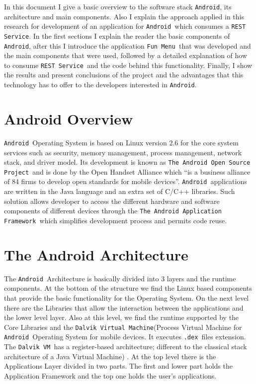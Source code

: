 \documentclass[journal]{IEEEtran}
\newcommand{\andr}{\texttt{Android}}
\newcommand{\andrs}{\texttt{Android~}}
\newcommand{\rests}{\texttt{REST Service}}
\newcommand{\restss}{\texttt{REST Service~}}
\newcommand{\funs}{\texttt{Fun Menu~}}
\newcommand{\aosps}{\texttt{The Android Open Source Project~}}
\newcommand{\apf}{\texttt{The Android Application Framework~}}
\newcommand{\dexs}{\texttt{.dex~}}
\newcommand{\dvm}{\texttt{Dalvik Virtual Machine}}
\newcommand{\dms}{\texttt{Dalvik VM~}}
\begin{document}
In this document I give a basic overview to the software stack \andr\cite{WikiAnd}, its architecture and main components. Also 
I explain the approach applied in this research for development of an application for \andrs which consumes a \rests\cite{rest}. 
In the first sections I explain the reader the basic components of \andr, after this I introduce the application \funs that was
developed and the main components that were used, followed by a detailed explanation of how to consume \restss and the code
behind this functionality. Finally, I show the results and present conclusions of the project and the advantages that
this technology has to offer to the developers interested in \andr.


\section{Android Overview}
\andrs Operating System is based on Linux version 2.6 for the core system services such as security, memory management, process
management, network stack, and driver model. Its development is known as \aosps and is done by the Open Handset Alliance which 
``is a business alliance of 84 firms to develop open standards for mobile devices''\cite{WikiOp}. \andrs applications are written
in the Java language and an extra set of C/C++ libraries. Such solution allows developer to access the different hardware and 
software components of different devices through the \apf which simplifies development process and permits code reuse.



\section{The Android Architecture}
The \andrs Architecture is basically divided into 3 layers and the runtime components\cite{And}. At the bottom of the structure we find
the Linux based components that provide the basic functionality for the Operating System. On the next level there are the Libraries
that allow the interaction between the applications and the lower level layer. Also at this level, we find the runtime supported by the
Core Libraries and the \dvm(Process Virtual Machine for \andrs Operating System for mobile devices. It executes \dexs files 
extension. The \dms has a register-based architecture; different to the classical stack architecture of a Java Virtual Machine)
\cite{dalvikvm}\cite{dalvik}. At the top level there is the Applications Layer divided in two parts. The first and lower part holds the Application 
Framework and the top one holds the user's applications.
\end{document}
